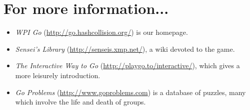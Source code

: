 \documentclass{article}
\begin{document}
\section*{For more information...}
\begin{itemize}
\item \emph{WPI Go} (\url{http://go.hashcollision.org/}) is our homepage.

\item \emph{Sensei's Library} (\url{http://senseis.xmp.net/}), a wiki
  devoted to the game.

\item \emph{The Interactive Way to Go}
  (\url{http://playgo.to/interactive/}), which gives a more leisurely
  introduction.

\item \emph{Go Problems}
 (\url{http://www.goproblems.com}) is a database of puzzles, many
  which involve the life and death of groups.

\end{itemize}
\end{document}
